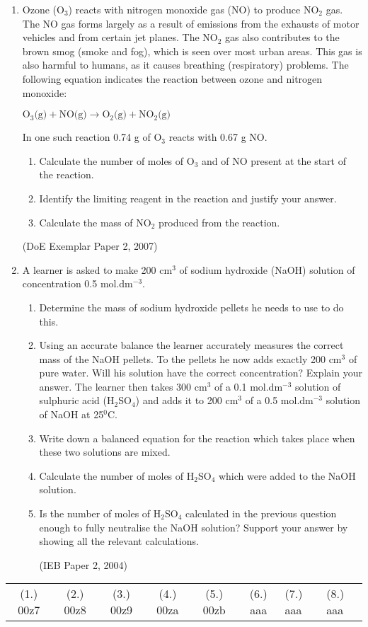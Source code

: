 \begin{eocexercises}{}
\begin{enumerate}
\item{Ozone (O$_{3}$) reacts with nitrogen monoxide gas (NO) to produce NO$_{2}$ gas. The NO gas forms largely as a result of emissions from the exhausts of motor vehicles and from certain jet planes. The NO$_{2}$ gas also contributes to the brown smog (smoke and fog), which is seen over most urban areas. This gas is also harmful to humans, as it causes breathing (respiratory) problems. The following equation indicates the reaction between ozone and nitrogen monoxide:
\begin{center}
$\text{O}_{3}\text{(g)} + \text{NO(g)} \rightarrow \text{O}_{2}\text{(g)} + \text{NO}_{2}\text{(g)}$
\end{center}
In one such reaction 0.74 g of O$_{3}$ reacts with 0.67 g NO.
\begin{enumerate}
\item{Calculate the number of moles of O$_{3}$ and of NO present at the start of the reaction.}
\item{Identify the limiting reagent in the reaction and justify your answer.}
\item{Calculate the mass of NO$_{2}$ produced from the reaction.}
\end{enumerate}
(DoE Exemplar Paper 2, 2007)}
\item{A learner is asked to make 200 cm$^{3}$ of sodium hydroxide (NaOH) solution of concentration 0.5 mol.dm$^{-3}$.
\begin{enumerate}
\item{Determine the mass of sodium hydroxide pellets he needs to use to do this.}
\item{Using an accurate balance the learner accurately measures the correct mass of the NaOH pellets. To the pellets he now adds exactly 200 cm$^{3}$ of pure water. Will his solution have the correct concentration? Explain your answer.
\newline
The learner then takes 300 cm$^{3}$ of a 0.1 mol.dm$^{-3}$ solution of sulphuric acid (H$_{2}$SO$_{4}$) and adds it to 200 cm$^{3}$ of a 0.5 mol.dm$^{-3}$ solution of NaOH at 25$^{0}$C.}
\item{Write down a balanced equation for the reaction which takes place when these two solutions are mixed.}
\item{Calculate the number of moles of H$_{2}$SO$_{4}$ which were added to the NaOH solution.}
\item{Is the number of moles of H$_{2}$SO$_{4}$ calculated in the previous question enough to fully neutralise the NaOH solution? Support your answer by showing all the relevant calculations.}

(IEB Paper 2, 2004)
\end{enumerate}
}
\end{enumerate}

\practiceinfo

\begin{tabular}[h]{cccccc}
(1.) 00z7 & (2.) 00z8 & (3.) 00z9 & (4.) 00za & (5.) 00zb & (6.) aaa & (7.) aaa & (8.) aaa & 
 \end{tabular}
\end{eocexercises}








